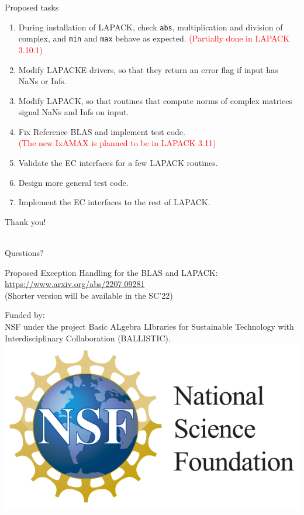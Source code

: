 \documentclass[11pt]{beamer}
\begin{document}
\begin{frame}{Proposed tasks}

	\begin{enumerate}
		\setlength\itemsep{0.7em}
		\item During installation of LAPACK, check \texttt{abs}, multiplication and division of complex, and \texttt{min} and \texttt{max} behave as expected. \textcolor{red}{\small (Partially done in LAPACK 3.10.1)}
		\item Modify LAPACKE drivers, so that they return an error flag if input has NaNs or Infs.
		\item Modify LAPACK, so that routines that compute norms of complex matrices signal NaNs and Infs on input.
		\item Fix Reference BLAS and implement test code.\\
		\textcolor{red}{\small (The new IxAMAX is planned to be in LAPACK 3.11)}
		\item Validate the EC interfaces for a few LAPACK routines.
		\item Design more general test code.
		\item Implement the EC interfaces to the rest of LAPACK.
	\end{enumerate}

\end{frame}

\begin{frame}

\vspace{50pt}
\begin{center}
	{\LARGE Thank you!}
	
	~\\
	{\Large Questions?}
\end{center}

\vspace{30pt}
\begin{center}
	\small
Proposed Exception Handling
for the BLAS and LAPACK:\\ \url{https://www.arxiv.org/abs/2207.09281}\\
(Shorter version will be available in the SC'22)
\end{center}

\vspace{10pt}
\begin{center}
	\small
Funded by:\\
NSF under the project
Basic ALgebra LIbraries for Sustainable
Technology with Interdisciplinary Collaboration
(BALLISTIC).\\
\includegraphics[height=.15\linewidth]{img/NSF}
\end{center}

\end{frame}
\end{document}
